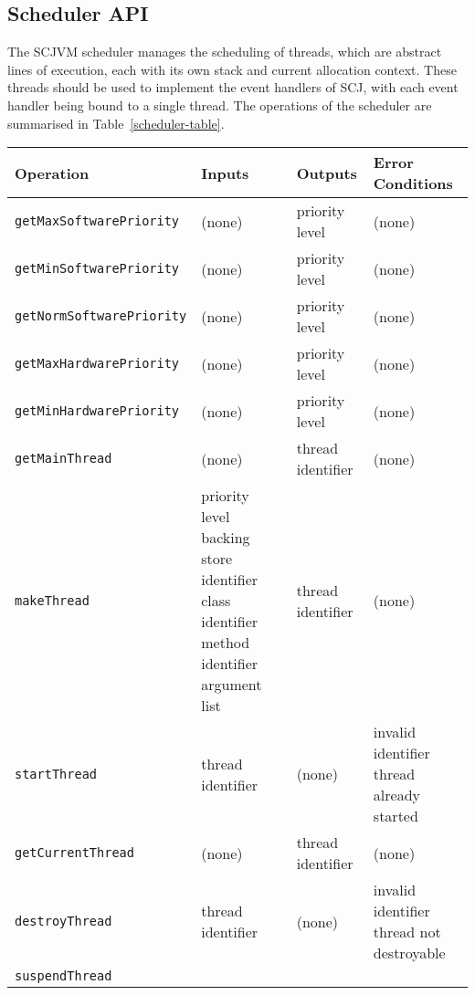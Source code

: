 \documentclass[a4paper,10pt]{report}
\begin{document}
\subsection{Scheduler API}
\label{scheduler-section}

The SCJVM scheduler manages the scheduling of threads, which are
abstract lines of execution, each with its own stack and current
allocation context.
These threads should be used to implement the event handlers of SCJ,
with each event handler being bound to a single thread.
The operations of the scheduler are summarised in
Table~\ref{scheduler-table}.

\begin{table*}[ht]
  \centering
  \footnotesize
  \begin{tabular}{|l|p{3.2cm}|p{2.3cm}|p{3.6cm}|}
    Operation & Inputs & Outputs & Error Conditions \\
    \hline
    \texttt{getMaxSoftwarePriority} &
    (none) &
    priority level &
    (none)
    \\\texttt{getMinSoftwarePriority} &
    (none) &
    priority level &
    (none)
    \\\texttt{getNormSoftwarePriority} &
    (none) &
    priority level &
    (none)
    \\\texttt{getMaxHardwarePriority} &
    (none) &
    priority level &
    (none)
    \\\texttt{getMinHardwarePriority} &
    (none) &
    priority level &
    (none)
    \\\texttt{getMainThread} &
    (none) &
    thread identifier &
    (none)
    \\\texttt{makeThread} &
    priority level \newline
    backing store identifier \newline
    class identifier \newline
    method identifier \newline 
    argument list &
    thread identifier &
    (none)
    \\\texttt{startThread} &
    thread identifier &
    (none) &
    invalid identifier \newline
    thread already started
    \\\texttt{getCurrentThread} &
    (none) &
    thread identifier &
    (none)
    \\\texttt{destroyThread} &
    thread identifier &
    (none) &
    invalid identifier \newline
    thread not destroyable
    \\\texttt{suspendThread} &

\end{tabular}
\end{table*}
\end{document}
